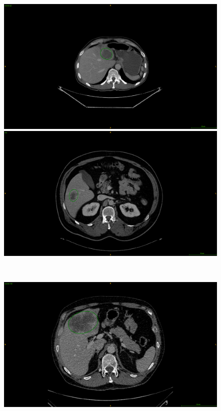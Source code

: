 \begin{figure}[!ht]
	\centering
	\begin{minipage}{0.45\linewidth}
		\includegraphics[width=\linewidth]{../Contributions/images/LITS_exampleSmallTumor_withEllipse}
	\end{minipage} \hspace{-0.1cm}
	\begin{minipage}{0.45\linewidth}
		\includegraphics[width=\linewidth]{../Contributions/images/LITS_exampleSmallTumor_withEllipse_2}
	\end{minipage} \\
	\begin{minipage}{0.45\linewidth}
		\includegraphics[width=\linewidth]{../Contributions/images/LITS_exampleLargeTumor_withEllipse}

\end{minipage}
\end{figure}
